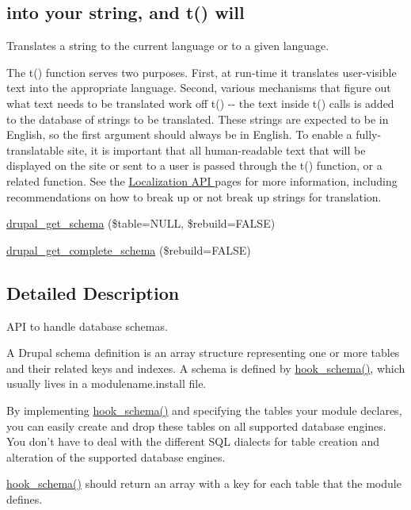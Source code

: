 \subsection*{into your string, and t() will}
\label{_amgrpc24520cd0c9d113d5113bfec581ba6b9}
 Translates a string to the current language or to a given language.

The t() function serves two purposes. First, at run-\/time it translates user-\/visible text into the appropriate language. Second, various mechanisms that figure out what text needs to be translated work off t() -\/-\/ the text inside t() calls is added to the database of strings to be translated. These strings are expected to be in English, so the first argument should always be in English. To enable a fully-\/translatable site, it is important that all human-\/readable text that will be displayed on the site or sent to a user is passed through the t() function, or a related function. See the \hyperlink{}{Localization API } pages for more information, including recommendations on how to break up or not break up strings for translation.\begin{DoxyCompactItemize}
\item 
\hyperlink{group__schemaapi_ga979670bd6bd2e34337ffc5f0810f2d71}{drupal\_\-get\_\-schema} (\$table=NULL, \$rebuild=FALSE)
\item 
\hyperlink{group__schemaapi_ga31cee7d4c13fafc15c69304f16e34686}{drupal\_\-get\_\-complete\_\-schema} (\$rebuild=FALSE)
\end{DoxyCompactItemize}


\subsection{Detailed Description}
API to handle database schemas.

A Drupal schema definition is an array structure representing one or more tables and their related keys and indexes. A schema is defined by \hyperlink{group__schemaapi_ga9abd926ddaf68a22e6dca28a25d0c6f5}{hook\_\-schema()}, which usually lives in a modulename.install file.

By implementing \hyperlink{group__schemaapi_ga9abd926ddaf68a22e6dca28a25d0c6f5}{hook\_\-schema()} and specifying the tables your module declares, you can easily create and drop these tables on all supported database engines. You don't have to deal with the different SQL dialects for table creation and alteration of the supported database engines.

\hyperlink{group__schemaapi_ga9abd926ddaf68a22e6dca28a25d0c6f5}{hook\_\-schema()} should return an array with a key for each table that the module defines.

